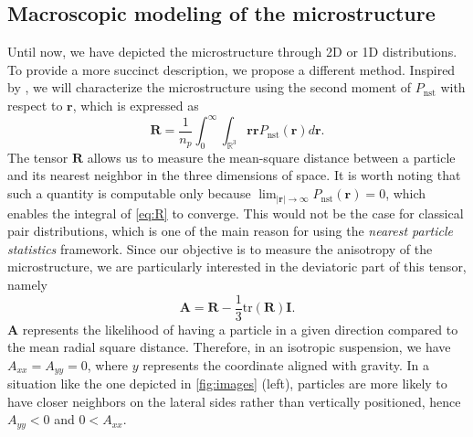 \subsection{Macroscopic modeling of the microstructure}
Until now, we have depicted the microstructure through 2D or 1D distributions. To provide a more succinct description, we propose a different method. Inspired by \citet{zhang2023evolution}, we will characterize the microstructure using the second moment of $P_\text{nst}$ with respect to $\mathbf{r}$, which is expressed as
\begin{equation}
    \textbf{R} =\frac{1}{n_p} 
    \int_0^\infty 
    \int_{\mathbb{R}^3} \textbf{rr} P_\text{nst}(\textbf{r}) d\textbf{r}.
    \label{eq:R}
\end{equation}
The tensor $\textbf{R}$ allows us to measure the mean-square distance between a particle and its nearest neighbor in the three dimensions of space.
It is worth noting that such a quantity is computable only because $\lim_{|\textbf{r}|\to \infty} P_\text{nst}(\textbf{r}) = 0$, which enables the integral of \ref{eq:R} to converge. 
This would not be the case for classical pair distributions, which is one of the main reason for using the \textit{nearest particle statistics} framework. Since our objective is to measure the anisotropy of the microstructure, we are particularly interested in the deviatoric part of this tensor, namely
\begin{equation*}
    \textbf{A} = \textbf{R} - \frac{1}{3}  \text{tr}(\textbf{R}) \textbf{I}.
\end{equation*}
$\textbf{A}$ represents the likelihood of having a particle in a given direction compared to the mean radial square distance. 
Therefore, in an isotropic suspension, we have $A_{xx} = A_{yy} = 0$, where $y$ represents the coordinate aligned with gravity. 
In a situation like the one depicted in \ref{fig:images} (left), particles are more likely to have closer neighbors on the lateral sides rather than vertically positioned, hence  $A_{yy} < 0$ and $0 < A_{xx}$. 


